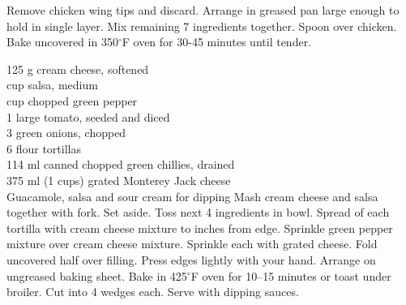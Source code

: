 \begin{minipage}{\linewidth}
\end{minipage}\par\begin{minipage}{\linewidth}  
{Remove chicken wing tips and discard. Arrange in greased pan large enough to hold in single layer. Mix remaining 7 ingredients together. Spoon over chicken. Bake uncovered in 350$^\circ$F oven for 30-45 minutes until tender.}

\end{minipage}\par\begin{minipage}{\linewidth} 
	\step
	{125 g cream cheese, softened	 \\
	  cup salsa, medium \\
	  cup chopped green pepper \\	
	 1 large tomato, seeded and diced \\
	 3 green onions, chopped	 \\
	 6 flour tortillas \\
	 114 ml canned chopped green chillies, drained \\
	 375 ml (1  cups) grated Monterey Jack cheese \\
 Guacamole, salsa and sour cream for dipping
		}{
Mash cream cheese and salsa together with fork. Set aside. Toss next 4 ingredients in bowl. Spread  of each tortilla with cream cheese mixture to  inches from edge. Sprinkle green pepper mixture over cream cheese mixture. Sprinkle each with grated cheese. Fold uncovered half over filling. Press edges lightly with your hand. Arrange on ungreased baking sheet. Bake in 425$^\circ$F oven for 10--15 minutes or toast under broiler. Cut into 4 wedges each. Serve with dipping sauces.}


\end{minipage}
